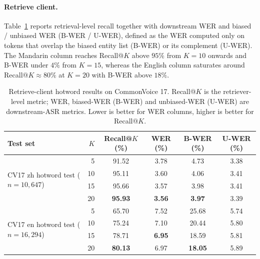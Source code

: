 \paragraph{Retrieve client.}
Table~\ref{tab:hotwords_retrieve} reports retrieval-level recall
together with downstream WER and biased / unbiased WER (B-WER /
U-WER), defined as the WER computed only on tokens that overlap
the biased entity list (B-WER) or its complement (U-WER). The
Mandarin column reaches Recall@$K$ above $95\%$ from $K=10$
onwards and B-WER under $4\%$ from $K=15$, whereas the English
column saturates around Recall@$K \approx 80\%$ at $K=20$ with
B-WER above $18\%$.

\begin{table}[t]
  \caption{Retrieve-client hotword results on CommonVoice 17.
    Recall@$K$ is the retriever-level metric; WER, biased-WER
    (B-WER) and unbiased-WER (U-WER) are downstream-ASR metrics.
    Lower is better for WER columns, higher is better for
    Recall@$K$.}
  \label{tab:hotwords_retrieve}
  \centering
  \small
  \begin{tabular}{lrcccc}
    \toprule
    Test set & $K$ & Recall@$K$ (\%) & WER (\%) & B-WER (\%) & U-WER (\%) \\
    \midrule
    \multirow{4}{*}{CV17 zh hotword test ($n=10{,}647$)}
                          & 5  & 91.52          & 3.78          & 4.73          & 3.38 \\
                          & 10 & 95.11          & 3.60          & 4.06          & 3.41 \\
                          & 15 & 95.66          & 3.57          & 3.98          & 3.41 \\
                          & 20 & \textbf{95.93} & \textbf{3.56} & \textbf{3.97} & 3.39 \\
    \midrule
    \multirow{4}{*}{CV17 en hotword test ($n=16{,}294$)}
                          & 5  & 65.70          & 7.52          & 25.68          & 5.74 \\
                          & 10 & 75.24          & 7.10          & 20.44          & 5.80 \\
                          & 15 & 78.71          & \textbf{6.95} & 18.59          & 5.81 \\
                          & 20 & \textbf{80.13} & 6.97          & \textbf{18.05} & 5.89 \\
    \bottomrule
  \end{tabular}
\end{table}

